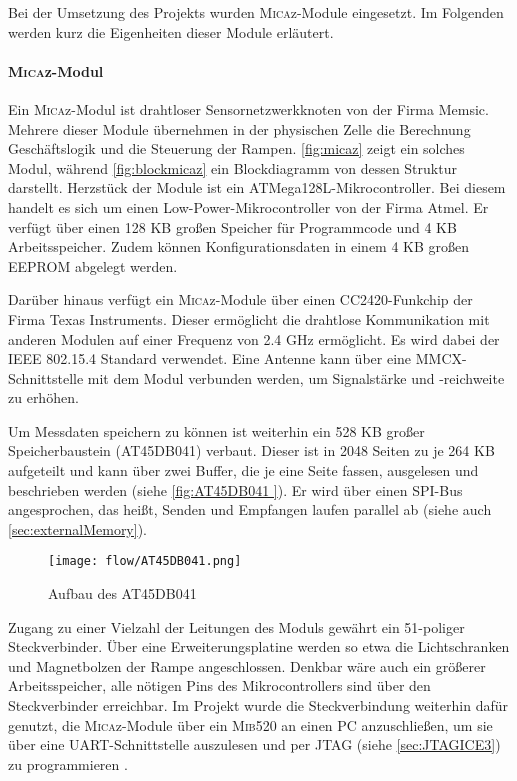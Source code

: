 Bei der Umsetzung des Projekts wurden \textsc{Mica}z-Module eingesetzt. Im Folgenden werden kurz die Eigenheiten dieser Module erläutert.

\paragraph{\textsc{Mica}z-Modul}
\label{MICAZ}
Ein \textsc{Mica}z-Modul ist drahtloser Sensornetzwerkknoten von der Firma Memsic. Mehrere dieser Module übernehmen in der physischen Zelle die Berechnung Geschäftslogik und die Steuerung der Rampen. \autoref{fig:micaz} zeigt ein solches Modul, während \autoref{fig:blockmicaz}  ein Blockdiagramm von dessen Struktur darstellt. Herzstück der Module ist ein ATMega128L-Mikrocontroller. Bei diesem handelt es sich um einen Low-Power-Mikrocontroller von der Firma Atmel. Er verfügt  über einen 128 KB großen Speicher für Programmcode und 4 KB Arbeitsspeicher. Zudem können Konfigurationsdaten in einem 4 KB großen EEPROM abgelegt werden.

Darüber hinaus verfügt ein \textsc{Mica}z-Module über einen CC2420-Funkchip der Firma Texas Instruments. Dieser ermöglicht die drahtlose Kommunikation mit anderen Modulen auf einer Frequenz von 2.4 GHz ermöglicht. Es wird dabei der IEEE 802.15.4 Standard verwendet. Eine Antenne kann über eine MMCX-Schnittstelle mit dem Modul verbunden werden, um Signalstärke und -reichweite zu erhöhen. 

Um Messdaten speichern zu können ist weiterhin ein 528 KB großer Speicherbaustein (AT45DB041) verbaut. Dieser ist in 2048 Seiten zu je 264 KB aufgeteilt und kann über zwei Buffer, die je eine Seite fassen, ausgelesen und beschrieben werden (siehe \autoref{fig:AT45DB041 }). Er wird über einen SPI-Bus angesprochen, das heißt, Senden und Empfangen laufen parallel ab (siehe auch \autoref{sec:externalMemory}).

\begin{figure}[th]
	\centering
		\texttt{[image: flow/AT45DB041.png]}
	\caption{Aufbau des AT45DB041 \cite{AT45DB041A:2014:Online}}
	\label{fig:AT45DB041 }
\end{figure}

Zugang zu einer Vielzahl der Leitungen des Moduls gewährt ein 51-poliger Steckverbinder. Über eine Erweiterungsplatine werden so etwa die Lichtschranken und Magnetbolzen der Rampe angeschlossen. Denkbar wäre auch ein größerer Arbeitsspeicher, alle nötigen Pins des Mikrocontrollers sind über den Steckverbinder erreichbar.
Im Projekt wurde die Steckverbindung weiterhin dafür genutzt, die \textsc{Mica}z-Module über ein \textsc{Mib}520 an einen PC anzuschließen, um sie über eine UART-Schnittstelle auszulesen und per JTAG (siehe \autoref{sec:JTAGICE3}) zu programmieren \cite{Memsic:2014:Online,CC2420:2014:Online}.

